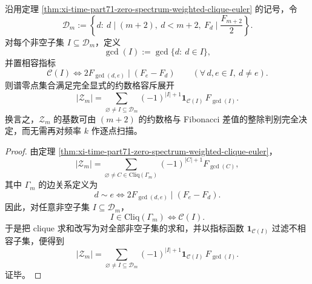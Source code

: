 \begin{theorem}[谱零点集合的约数格指标容斥公式]\label{thm:xi-time-part72-zero-spectrum-divisor-lattice-indicator-inclusion-exclusion}
沿用定理 \ref{thm:xi-time-part71-zero-spectrum-weighted-clique-euler} 的记号，令
\[
\mathcal D_m:=
\left\{
d:\ d\mid (m+2),\ d<m+2,\ F_d\mid \frac{F_{m+2}}{2}
\right\}.
\]
对每个非空子集 \(I\subseteq \mathcal D_m\)，定义
\[
\gcd(I):=\gcd\{d:\ d\in I\},
\]
并置相容指标
\[
\mathcal C(I)
\iff
2F_{\gcd(d,e)}\mid (F_e-F_d)
\qquad
(\forall\, d,e\in I,\ d\neq e).
\]
则谱零点集合满足完全显式的约数格容斥展开
\[
|\mathcal Z_m|
=
\sum_{\varnothing\neq I\subseteq \mathcal D_m}
(-1)^{|I|+1}\mathbf 1_{\mathcal C(I)}\,F_{\gcd(I)}.
\]
换言之，\(\mathcal Z_m\) 的基数可由 \((m+2)\) 的约数格与 Fibonacci 差值的整除判别完全决定，而无需再对频率 \(k\) 作逐点扫描。
\end{theorem}
\begin{proof}
由定理 \ref{thm:xi-time-part71-zero-spectrum-weighted-clique-euler}，
\[
|\mathcal Z_m|
=
\sum_{\varnothing\neq C\in \mathrm{Cliq}(\Gamma_m)}
(-1)^{|C|+1}F_{\gcd(C)},
\]
其中 \(\Gamma_m\) 的边关系定义为
\[
d\sim e
\iff
2F_{\gcd(d,e)}\mid (F_e-F_d).
\]
因此，对任意非空子集 \(I\subseteq \mathcal D_m\)，
\[
I\in \mathrm{Cliq}(\Gamma_m)
\iff
\mathcal C(I).
\]
于是把 clique 求和改写为对全部非空子集的求和，并以指标函数 \(\mathbf 1_{\mathcal C(I)}\) 过滤不相容子集，便得到
\[
|\mathcal Z_m|
=
\sum_{\varnothing\neq I\subseteq \mathcal D_m}
(-1)^{|I|+1}\mathbf 1_{\mathcal C(I)}\,F_{\gcd(I)}.
\]
证毕。
\end{proof}

